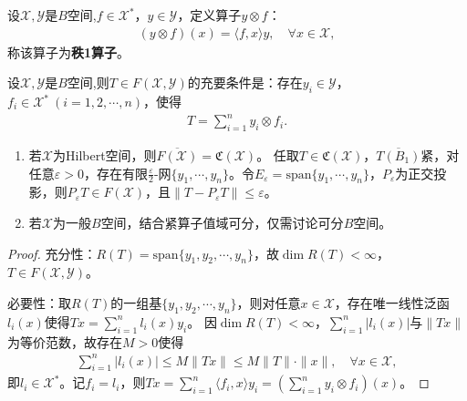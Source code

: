 \documentclass[../../main.tex]{subfiles}%
\begin{document}
\begin{definition}
设$\mathscr{X},\mathscr{Y}$是$B$空间,$f\in\mathscr{X}^*$，$y\in\mathscr{Y}$，定义算子$y\otimes f$：
\begin{align*}
(y\otimes f)(x)=\langle f,x\rangle y,\quad \forall x\in\mathscr{X},
\end{align*}
称该算子为\textbf{秩1算子}。
\end{definition}

\begin{theorem}
设$\mathscr{X},\mathscr{Y}$是$B$空间,则$T\in F(\mathscr{X},\mathscr{Y})$的充要条件是：存在$y_i\in\mathscr{Y}$，$f_i\in\mathscr{X}^*\ (i=1,2,\cdots,n)$，使得
\begin{align*}
T=\sum\limits_{i=1}^{n}y_i\otimes f_i.
\end{align*}
\end{theorem}
\begin{remark}
\begin{enumerate}[(1)]
\item 若$\mathscr{X}$为Hilbert空间，则$\overline{F(\mathscr{X})}=\mathfrak{C}(\mathscr{X})$。
任取$T\in\mathfrak{C}(\mathscr{X})$，$\overline{T(B_1)}$紧，对任意$\varepsilon>0$，存在有限$\frac{\varepsilon}{2}$-网$\{y_1,\cdots,y_n\}$。令$E_\varepsilon=\mathrm{span}\{y_1,\cdots,y_n\}$，$P_\varepsilon$为正交投影，则$P_\varepsilon T\in F(\mathscr{X})$，且$\|T-P_\varepsilon T\|\leqslant\varepsilon$。
\item 若$\mathscr{X}$为一般$B$空间，结合紧算子值域可分，仅需讨论可分$B$空间。
\end{enumerate}
\end{remark}
\begin{proof}

{\heiti 充分性：}$R(T)=\mathrm{span}\{y_1,y_2,\cdots,y_n\}$，故$\dim R(T)<\infty$，$T\in F(\mathscr{X},\mathscr{Y})$。

{\heiti 必要性：}取$R(T)$的一组基$\{y_1,y_2,\cdots,y_n\}$，则对任意$x\in\mathscr{X}$，存在唯一线性泛函$l_i(x)$使得$Tx=\sum\limits_{i=1}^{n}l_i(x)y_i$。
因$\dim R(T)<\infty$，$\sum\limits_{i=1}^{n}|l_i(x)|$与$\|Tx\|$为等价范数，故存在$M>0$使得
\begin{align*}
\sum\limits_{i=1}^{n}|l_i(x)|\leqslant M\|Tx\|\leqslant M\|T\|\cdot\|x\|,\quad \forall x\in\mathscr{X},
\end{align*}
即$l_i\in\mathscr{X}^*$。记$f_i=l_i$，则$Tx=\sum\limits_{i=1}^{n}\langle f_i,x\rangle y_i=\left(\sum\limits_{i=1}^{n}y_i\otimes f_i\right)(x)$。

\end{proof}
\end{document}
